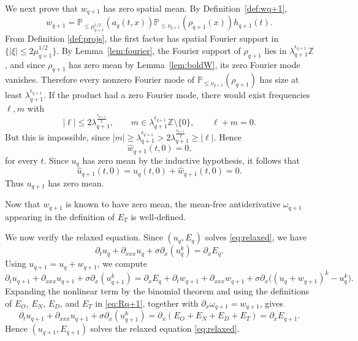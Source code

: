 \documentclass[12pt,reqno,letterpaper]{amsart}
\numberwithin{equation}{section}
\newcommand{\1}{{\bf 1}}
\newcommand{\2}{{\bf 2}}
\theoremstyle{remark}
\theoremstyle{remark}
\begin{document}
We next prove that $w_{q+1}$ has zero spatial mean. By Definition~\ref{def:wq+1},
\[
w_{q+1} = \mathbb P_{\le \mu_{q+1}^{1/2}}(a_q(t,x))\mathbb P_{\le \nu_{q+1}}(\rho_{q+1}(x)) h_{q+1}(t).
\]
From Definition \ref{def:projs}, the first factor has spatial Fourier support in $\{|\xi|\le 2\mu_{q+1}^{1/2}\}$. By Lemma~\ref{lem:fourier}, the Fourier support of $\rho_{q+1}$ lies in $\lambda_{q+1}^{\epsilon_{q+1}}\mathbb Z$, and since $\rho_{q+1}$ has zero mean by Lemma~\ref{lem:boldW}, its zero Fourier mode vanishes. Therefore every nonzero Fourier mode of $\mathbb P_{\le \nu_{q+1}}(\rho_{q+1})$ has size at least $\lambda_{q+1}^{\epsilon_{q+1}}$. If the product had a zero Fourier mode, there would exist frequencies $\ell,m$ with
\[
|\ell|\le 2\lambda_{q+1}^{\frac{\epsilon_{q+1}}{2}},\qquad m\in \lambda_{q+1}^{\epsilon_{q+1}}\mathbb Z\setminus\{0\},\qquad \ell+m=0.
\]
But this is impossible, since $|m|\ge \lambda_{q+1}^{\epsilon_{q+1}}>2\lambda_{q+1}^{\frac{\epsilon_{q+1}}{2}}\ge |\ell|$. Hence
\[
\hat{w}_{q+1}(t,0)=0.
\]for every $t$. Since $u_q$ has zero mean by the inductive hypothesis, it follows that
\[
\hat{u}_{q+1}(t,0)=\hat{u}_q(t,0)+\hat{w}_{q+1}(t,0)=0.
\]
Thus $u_{q+1}$ has zero mean.

Now that $w_{q+1}$ is known to have zero mean, the mean-free antiderivative $\omega_{q+1}$ appearing in the definition of $E_T$ is well-defined.

We now verify the relaxed equation. Since $(u_q,E_q)$ solves \eqref{eq:relaxed}, we have
\[
\partial_t u_q+\partial_{xxx}u_q+\sigma\partial_x(u_q^k)=\partial_x E_q.
\]
Using $u_{q+1}=u_q+w_{q+1}$, we compute
\[
\partial_t u_{q+1}+\partial_{xxx}u_{q+1}+\sigma\partial_x(u_{q+1}^k) = \partial_x E_q+\partial_t w_{q+1}+\partial_{xxx}w_{q+1} +\sigma\partial_x\bigl((u_q+w_{q+1})^k-u_q^k\bigr).
\]
Expanding the nonlinear term by the binomial theorem and using the definitions of $E_O$, $E_N$, $E_D$, and $E_T$ in \eqref{eq:Rq+1}, together with $\partial_x\omega_{q+1}=w_{q+1}$, gives
\[
\partial_t u_{q+1}+\partial_{xxx}u_{q+1}+\sigma\partial_x(u_{q+1}^k)
= \partial_x(E_O+E_N+E_D+E_T) = \partial_x E_{q+1}.
\]
Hence $(u_{q+1},E_{q+1})$ solves the relaxed equation \eqref{eq:relaxed}.

\end{document}
